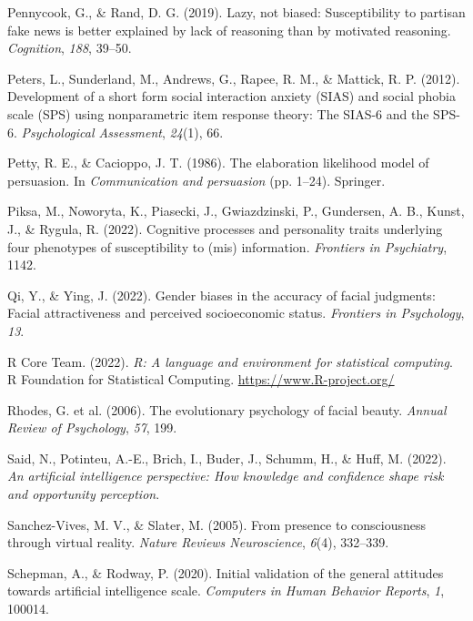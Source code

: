 \documentclass[
  man,
  floatsintext,
  longtable,
  nolmodern,
  notxfonts,
  notimes,
  colorlinks=true,linkcolor=blue,citecolor=blue,urlcolor=blue]{apa7}
\newlength{\cslhangindent}
\newenvironment{CSLReferences}[2] %
 {\begin{list}{}{%
  \setlength{\itemindent}{0pt}
  \setlength{\leftmargin}{0pt}
  \setlength{\parsep}{0pt}
  \ifodd #1
   \setlength{\leftmargin}{\cslhangindent}
   \setlength{\itemindent}{-1\cslhangindent}
  \fi
  \setlength{\itemsep}{#2\baselineskip}}}
 {\end{list}}
\begin{document}
\begin{CSLReferences}{1}{0}
Pennycook, G., \& Rand, D. G. (2019). Lazy, not biased: Susceptibility
to partisan fake news is better explained by lack of reasoning than by
motivated reasoning. \emph{Cognition}, \emph{188}, 39--50.

Peters, L., Sunderland, M., Andrews, G., Rapee, R. M., \& Mattick, R. P.
(2012). Development of a short form social interaction anxiety (SIAS)
and social phobia scale (SPS) using nonparametric item response theory:
The SIAS-6 and the SPS-6. \emph{Psychological Assessment}, \emph{24}(1),
66.

Petty, R. E., \& Cacioppo, J. T. (1986). The elaboration likelihood
model of persuasion. In \emph{Communication and persuasion} (pp. 1--24).
Springer.

Piksa, M., Noworyta, K., Piasecki, J., Gwiazdzinski, P., Gundersen, A.
B., Kunst, J., \& Rygula, R. (2022). Cognitive processes and personality
traits underlying four phenotypes of susceptibility to (mis)
information. \emph{Frontiers in Psychiatry}, 1142.

Qi, Y., \& Ying, J. (2022). Gender biases in the accuracy of facial
judgments: Facial attractiveness and perceived socioeconomic status.
\emph{Frontiers in Psychology}, \emph{13}.

R Core Team. (2022). \emph{R: A language and environment for statistical
computing}. R Foundation for Statistical Computing.
\url{https://www.R-project.org/}

Rhodes, G. et al. (2006). The evolutionary psychology of facial beauty.
\emph{Annual Review of Psychology}, \emph{57}, 199.

Said, N., Potinteu, A.-E., Brich, I., Buder, J., Schumm, H., \& Huff, M.
(2022). \emph{An artificial intelligence perspective: How knowledge and
confidence shape risk and opportunity perception}.

Sanchez-Vives, M. V., \& Slater, M. (2005). From presence to
consciousness through virtual reality. \emph{Nature Reviews
Neuroscience}, \emph{6}(4), 332--339.

Schepman, A., \& Rodway, P. (2020). Initial validation of the general
attitudes towards artificial intelligence scale. \emph{Computers in
Human Behavior Reports}, \emph{1}, 100014.


\end{CSLReferences}
\end{document}
